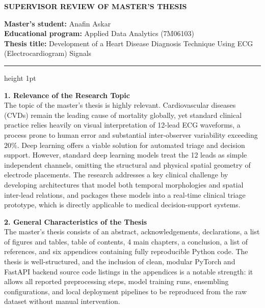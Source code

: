 \documentclass[12pt,a4paper]{article}
\begin{document}
\begin{center}
    \bfseries\large
    SUPERVISOR REVIEW OF MASTER'S THESIS
\end{center}
\vspace{1em}

\noindent
\textbf{Master's student:} Anafin Askar \\
\textbf{Educational program:} Applied Data Analytics (7M06103) \\
\textbf{Thesis title:} Development of a Heart Disease Diagnosis Technique Using ECG (Electrocardiogram) Signals \\

\hrule height 1pt
\vspace{1.5em}

\noindent
\textbf{1. Relevance of the Research Topic} \\
The topic of the master's thesis is highly relevant. Cardiovascular diseases (CVDs) remain the leading cause of mortality globally, yet standard clinical practice relies heavily on visual interpretation of 12-lead ECG waveforms, a process prone to human error and substantial inter-observer variability exceeding $20\%$. Deep learning offers a viable solution for automated triage and decision support. However, standard deep learning models treat the 12 leads as simple independent channels, omitting the structural and physical spatial geometry of electrode placements. The research addresses a key clinical challenge by developing architectures that model both temporal morphologies and spatial inter-lead relations, and packages these models into a real-time clinical triage prototype, which is directly applicable to medical decision-support systems.
\vspace{1em}

\noindent
\textbf{2. General Characteristics of the Thesis} \\
The master's thesis consists of an abstract, acknowledgements, declarations, a list of figures and tables, table of contents, 4 main chapters, a conclusion, a list of references, and six appendices containing fully reproducible Python code. The thesis is well-structured, and the inclusion of clean, modular PyTorch and FastAPI backend source code listings in the appendices is a notable strength: it allows all reported preprocessing steps, model training runs, ensembling configurations, and local deployment pipelines to be reproduced from the raw dataset without manual intervention.
\vspace{1em}
\end{document}
